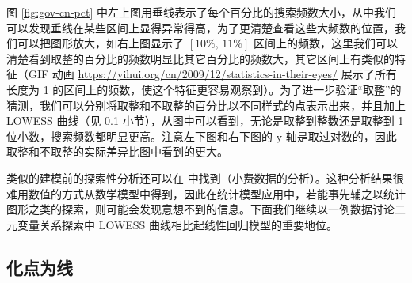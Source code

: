 \documentclass[
  b5paper,
  UTF8,twoside]{book}
\begin{document}
图 \ref{fig:gov-cn-pct} 中左上图用垂线表示了每个百分比的搜索频数大小，从中我们可以发现垂线在某些区间上显得异常得高，为了更清楚查看这些大频数的位置，我们可以把图形放大，如右上图显示了 \([10\%,\,11\%]\) 区间上的频数，这里我们可以清楚看到取整的百分比的频数明显比其它百分比的频数大，其它区间上有类似的特征（GIF 动画 \url{https://yihui.org/cn/2009/12/statistics-in-their-eyes/} 展示了所有长度为 1 的区间上的频数，使这个特征更容易观察到）。为了进一步验证``取整''的猜测，我们可以分别将取整和不取整的百分比以不同样式的点表示出来，并且加上 LOWESS 曲线（见 \ref{subsec:lowess} 小节），从图中可以看到，无论是取整到整数还是取整到 1 位小数，搜索频数都明显更高。注意左下图和右下图的 y 轴是取过对数的，因此取整和不取整的实际差异比图中看到的更大。

类似的建模前的探索性分析还可以在 \citet{Cook07} 中找到（小费数据的分析）。这种分析结果很难用数值的方式从数学模型中得到，因此在统计模型应用中，若能事先辅之以统计图形之类的探索，则可能会发现意想不到的信息。下面我们继续以一例数据讨论二元变量关系探索中 LOWESS 曲线相比起线性回归模型的重要地位。

\hypertarget{subsec:lowess}{%
\subsection{化点为线}\label{subsec:lowess}}
\end{document}
